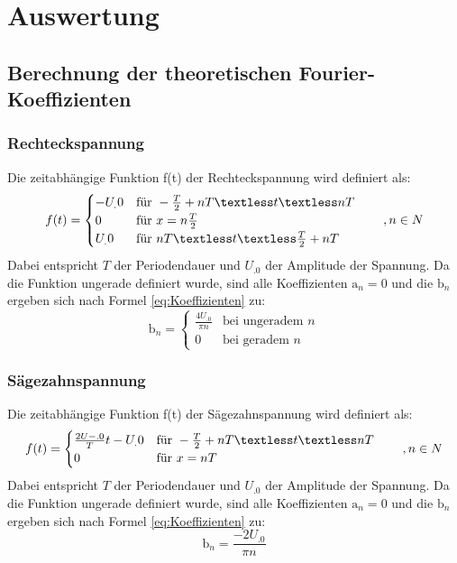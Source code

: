 \section{Auswertung}
\label{sec:Auswertung}

\subsection{Berechnung der theoretischen Fourier-Koeffizienten}
\subsubsection{Rechteckspannung}
Die zeitabhängige Funktion f(t) der Rechteckspannung wird definiert als:
\[
f(t)=
	\begin{cases}
     -U_.0 & \text{für } -\frac{T}{2}+nT \textless t \textless nT\\
     0  & \text{für } x=n\frac{T}{2} \\
     U_.0  & \text{für } nT \textless t \textless \frac{T}{2}+nT 
   	\end{cases}
\hspace{2em},n\in N
\]
Dabei entspricht $T$ der Periodendauer und $U_.0$ der Amplitude der Spannung. Da die Funktion ungerade definiert wurde, sind alle Koeffizienten $\mathrm{a}_n=0$ und die $\mathrm{b}_n$ ergeben sich nach Formel \eqref{eq:Koeffizienten} zu:
\begin{equation}
\mathrm{b}_n =
	\begin{cases} 
	\frac{4U_.0}{\pi n} & \text{bei ungeradem }n\\
	0 & \text{bei geradem }n
	\end{cases}
\end{equation}

\subsubsection{Sägezahnspannung}
Die zeitabhängige Funktion f(t) der Sägezahnspannung wird definiert als:
\[
f(t)=
	\begin{cases}
     \frac{2U-.0}{T}t-U_.0 & \text{für } -\frac{T}{2}+nT \textless t \textless nT\\
     0  & \text{für } x=nT
   	\end{cases}
\hspace{2em},n\in N
\]
Dabei entspricht $T$ der Periodendauer und $U_.0$ der Amplitude der Spannung. Da die Funktion ungerade definiert wurde, sind alle Koeffizienten $\mathrm{a}_n=0$ und die $\mathrm{b}_n$ ergeben sich nach Formel \eqref{eq:Koeffizienten} zu:
\begin{equation}
\mathrm{b}_n = \frac{-2U_.0}{\pi n} 
\end{equation}

